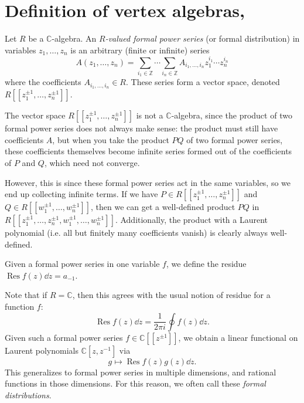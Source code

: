 
\section{Definition of vertex algebras, \cite{frenkel-ben-zvi}}

\begin{definition}\label{dfn:formal-power-series}
	Let $R$ be a $\mathbb{C} $-algebra. An \emph{$R$-valued formal power series} (or formal distribution) in variables $z_1, \ldots , z_n$ is an arbitrary (finite or infinite) series
	\[
		A(z_1, \ldots , z_n) = \sum_{i_1\in\mathbb{Z} } \cdots \sum_{i_n\in\mathbb{Z} } A_{i_1, \ldots , i_n} z_1^{i_1} \cdots z_n^{i_n} 
	\]
	where the coefficients $A_{i_1, \ldots , i_n} \in R$. These series form a vector space, denoted $R[[z_1^{\pm 1} ,  \ldots , z_{n} ^{\pm 1} ]]$.
\end{definition}

The vector space $R[[z_1^{\pm 1} ,  \ldots , z_{n} ^{\pm 1} ]]$ is not a $\mathbb{C} $-algebra, since the product of two formal power series does not always make sense: the product must still have coefficients $A$, but when you take the product $PQ$ of two formal power series, these coefficients themselves become infinite series formed out of the coefficients of $P$ and $Q$, which need not converge.

However, this is since these formal power series act in the same variables, so we end up collecting infinite terms. If we have $P\in R[[z_1^{\pm 1} ,  \ldots , z_{n} ^{\pm 1} ]]$ and $Q\in R[[w_1^{\pm 1} ,  \ldots , w_{n} ^{\pm 1} ]]$, then we can get a well-defined product $PQ$ in $R[[z_1^{\pm 1} ,  \ldots , z_{n} ^{\pm 1} , w_1^{\pm 1} , \ldots , w_n^{\pm 1}]]$. Additionally, the product with a Laurent polynomial (i.e. all but finitely many coefficients vanish) is clearly always well-defined.

\begin{definition}\label{dfn:residue}
	Given a formal power series in one variable $f$, we define the residue $\operatorname{Res} f(z)\dd z = a_{-1} $.
\end{definition}
Note that if $R=\mathbb{C} $, then this agrees with the usual notion of residue for a function $f$:
\[
	\operatorname{Res} f(z)\dd z = \frac{1}{2\pi i} \oint f(z)\dd z
.\]
Given such a formal power series $f\in \mathbb{C} [[z^{\pm 1} ]]$, we obtain a linear functional on Laurent polynomials $\mathbb{C} [z,z^{-1} ]$ via
\[
	g\mapsto \operatorname{Res} f(z)g(z)\dd z
.\]
This generalizes to formal power series in multiple dimensions, and rational functions in those dimensions. For this reason, we often call these \emph{formal distributions}.

